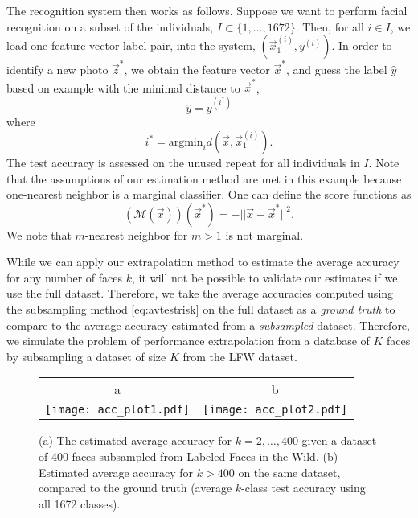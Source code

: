 \documentclass[12pt]{article}
\begin{document}
The recognition system then works as follows.  Suppose we want to
perform facial recognition on a subset of the individuals, $I \subset
\{1,\hdots, 1672\}$.  Then, for all $i \in I$, we load one feature
vector-label pair, into the system, $(\vec{x}_1^{(i)}, y^{(i)})$.  In
order to identify a new photo $\vec{z}^*$, we obtain the feature
vector $\vec{x}^*$, and guess the label $\hat{y}$ based on example
with the minimal distance to $\vec{x}^*$,
\[
\hat{y} = y^{(i^*)}
\]
where
\[
i^* = \text{argmin}_i d(\vec{x}, \vec{x}_1^{(i)}).
\]
The test accuracy is assessed on the unused repeat for all individuals
in $I$.  Note that the assumptions of our estimation method are met in
this example because one-nearest neighbor is a marginal classifier.
One can define the score functions as
\[
(\mathcal{M}(\vec{x}))(\vec{x}^*) = -||\vec{x} - \vec{x}^*||^2.
\]
We note that $m$-nearest neighbor for $m > 1$ is not marginal.

While we can apply our extrapolation method to estimate the average
accuracy for any number of faces $k$, it will not be possible to
validate our estimates if we use the full dataset.  Therefore, we take
the average accuracies computed using the subsampling method
\eqref{eq:avtestrisk} on the full dataset as a \emph{ground truth} to
compare to the average accuracy estimated from a \emph{subsampled}
dataset.  Therefore, we simulate the problem of performance
extrapolation from a database of $K$ faces by subsampling a
dataset of size $K$ from the LFW dataset.

\begin{figure}
\centering
\begin{tabular}{cc}
a & b\\
\texttt{[image: acc\_plot1.pdf]} &
\texttt{[image: acc\_plot2.pdf]}
\end{tabular}
\caption{(a) The estimated average accuracy for $k = 2,\hdots,
  400$ given a dataset of 400 faces subsampled from Labeled Faces in
  the Wild.  (b) Estimated average accuracy for $k > 400$ on the
  same dataset, compared to the ground truth (average $k$-class test accuracy
  using all 1672 classes).}
\label{fig:lfw_extrapolation1}
\end{figure}
\end{document}
